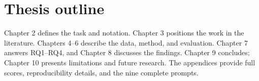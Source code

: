 \FloatBarrier

\section{Thesis outline}

Chapter 2 defines the task and notation. Chapter 3 positions the work in the literature. Chapters 4–6 describe the data, method, and evaluation. Chapter 7 answers RQ1–RQ4, and Chapter 8 discusses the findings. Chapter 9 concludes; Chapter 10 presents limitations and future research. The appendices provide full scores, reproducibility details, and the nine complete prompts.

